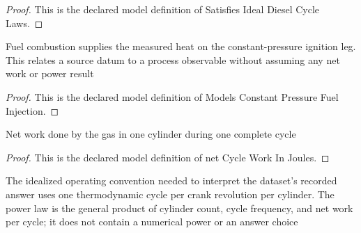\begin{proof}
  This is the declared model definition of Satisfies Ideal Diesel Cycle Laws.
\end{proof}
\begin{definition}
  \label{def:physics:phyx-mini-0438:phyxminiproblems-problemphyxmini0438-modelsconstantpressurefuelinjection}
  Fuel combustion supplies the measured heat on the constant-pressure ignition leg. This relates a source datum to a process observable without assuming any net work or power result
\end{definition}
\begin{proof}
  This is the declared model definition of Models Constant Pressure Fuel Injection.
\end{proof}
\begin{definition}
  \label{def:physics:phyx-mini-0438:phyxminiproblems-problemphyxmini0438-netcycleworkinjoules}
  Net work done by the gas in one cylinder during one complete cycle
\end{definition}
\begin{proof}
  This is the declared model definition of net Cycle Work In Joules.
\end{proof}
\begin{definition}
  \label{def:physics:phyx-mini-0438:phyxminiproblems-problemphyxmini0438-satisfiesenginetimingandpowerlaw}
  The idealized operating convention needed to interpret the dataset's recorded answer uses one thermodynamic cycle per crank revolution per cylinder. The power law is the general product of cylinder count, cycle frequency, and net work per cycle; it does not contain a numerical power or an answer choice
\end{definition}
